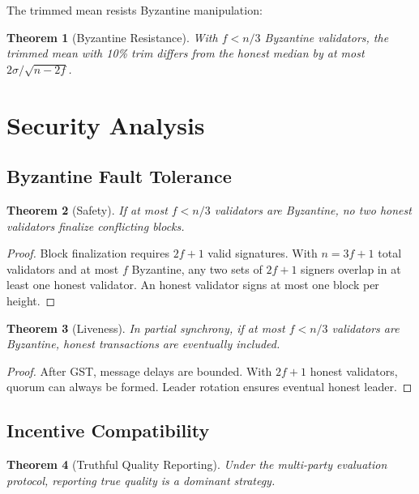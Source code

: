 \documentclass[11pt,letterpaper]{article}
\newtheorem{theorem}{Theorem}[section]
\begin{document}
The trimmed mean resists Byzantine manipulation:

\begin{theorem}[Byzantine Resistance]
With $f < n/3$ Byzantine validators, the trimmed mean with 10\% trim differs from the honest median by at most $2\sigma / \sqrt{n-2f}$.
\end{theorem}

\section{Security Analysis}
\label{sec:security}

\subsection{Byzantine Fault Tolerance}

\begin{theorem}[Safety]
If at most $f < n/3$ validators are Byzantine, no two honest validators finalize conflicting blocks.
\end{theorem}

\begin{proof}
Block finalization requires $2f+1$ valid signatures. With $n = 3f+1$ total validators and at most $f$ Byzantine, any two sets of $2f+1$ signers overlap in at least one honest validator. An honest validator signs at most one block per height.
\end{proof}

\begin{theorem}[Liveness]
In partial synchrony, if at most $f < n/3$ validators are Byzantine, honest transactions are eventually included.
\end{theorem}

\begin{proof}
After GST, message delays are bounded. With $2f+1$ honest validators, quorum can always be formed. Leader rotation ensures eventual honest leader.
\end{proof}

\subsection{Incentive Compatibility}

\begin{theorem}[Truthful Quality Reporting]
Under the multi-party evaluation protocol, reporting true quality is a dominant strategy.
\end{theorem}
\end{document}
